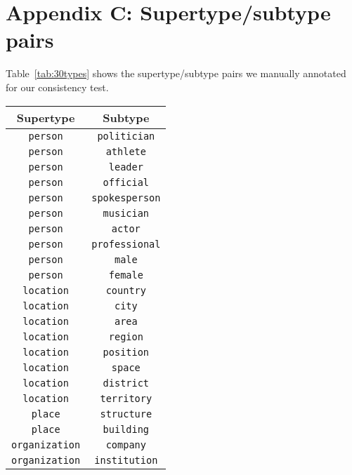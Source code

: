 \documentclass[11pt,a4paper]{article}
\begin{document}
\section*{Appendix C: Supertype/subtype pairs}\label{app:30types}

Table~\ref{tab:30types} shows the supertype/subtype pairs we manually annotated for our consistency test.

\renewcommand{\arraystretch}{1}
\begin{table}[H]
	\centering
	\small
	\setlength{\tabcolsep}{4pt}
	\begin{tabular}{c c}
		\toprule
		\multicolumn{1}{c}{Supertype} & \multicolumn{1}{c}{Subtype}\\
		\midrule
        {\tt person} & {\tt politician} \\
        {\tt person} & {\tt athlete} \\
        {\tt person} & {\tt leader} \\
        {\tt person} & {\tt official} \\
        {\tt person} & {\tt spokesperson} \\
        {\tt person} & {\tt musician} \\
        {\tt person} & {\tt actor} \\
        {\tt person} & {\tt professional} \\
        {\tt person} & {\tt male} \\
        {\tt person} & {\tt female} \\
        {\tt location} & {\tt country} \\
        {\tt location} & {\tt city} \\
        {\tt location} & {\tt area} \\
        {\tt location} & {\tt region} \\
        {\tt location} & {\tt position} \\
        {\tt location} & {\tt space} \\
        {\tt location} & {\tt district} \\
        {\tt location} & {\tt territory} \\
        {\tt place} & {\tt structure} \\
        {\tt place} & {\tt building} \\
        {\tt organization} & {\tt company} \\
        {\tt organization} & {\tt institution} \\

\end{tabular}
\end{table}
\end{document}
